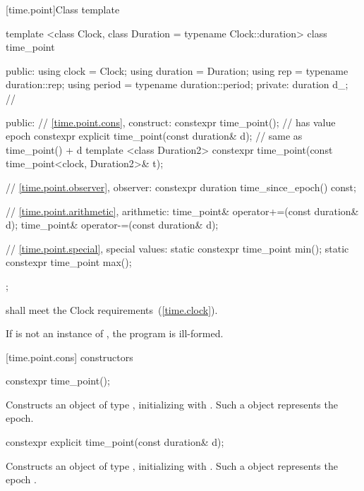 [time.point]{Class template }

%
\begin{codeblock}
template <class Clock, class Duration = typename Clock::duration>
class time_point {
public:
  using clock    = Clock;
  using duration = Duration;
  using rep      = typename duration::rep;
  using period   = typename duration::period;
private:
  duration d_;  // \expos

public:
  // \ref{time.point.cons}, construct:
  constexpr time_point();  // has value epoch
  constexpr explicit time_point(const duration& d);  // same as time_point() + d
  template <class Duration2>
    constexpr time_point(const time_point<clock, Duration2>& t);

  // \ref{time.point.observer}, observer:
  constexpr duration time_since_epoch() const;

  // \ref{time.point.arithmetic}, arithmetic:
  time_point& operator+=(const duration& d);
  time_point& operator-=(const duration& d);

  // \ref{time.point.special}, special values:
  static constexpr time_point min();
  static constexpr time_point max();
};
\end{codeblock}

\pnum
{} shall meet the Clock requirements~(\ref{time.clock}).

\pnum
If  is not an instance of ,
the program is ill-formed.

[time.point.cons]{ constructors}

%
\begin{itemdecl}
constexpr time_point();
\end{itemdecl}

\begin{itemdescr}
\pnum
\effects Constructs an object of type , initializing
 with . Such a  object
represents the epoch.
\end{itemdescr}

%
\begin{itemdecl}
constexpr explicit time_point(const duration& d);
\end{itemdecl}

\begin{itemdescr}
\pnum
\effects Constructs an object of type , initializing
 with . Such a  object represents the epoch
.
\end{itemdescr}

